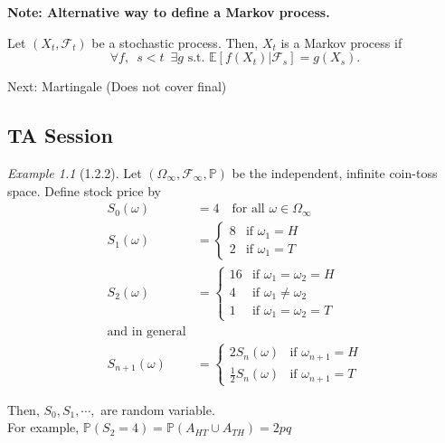 \documentclass[12pt]{report}
\newcommand{\F}{\mathcal{F}}
\newcommand{\E}{\mathbb{E}}
\renewcommand{\1}{\mathbb{1}}
\theoremstyle{break}
\theoremstyle{newdef}
\theoremstyle{remark}
\newtheorem*{exmp}{Example} %
\begin{document}
\vspace{5mm}

\textbf{Note: Alternative way to define a Markov process.}

Let $(X_t, \F_t)$ be a stochastic process.
Then, $X_t$ is a Markov process if
\[\forall f, \enspace s < t \enspace \exists g \text{ s.t. } \E[f(X_t) | \F_s] = g(X_s).\]

Next: Martingale (Does not cover final)





\begin{appendices}
\chapter{TA Session}
\begin{exmp}[1.2.2]
Let $(\Omega_\infty, \mathcal{F}_\infty, \mathbb{P})$ be the independent, infinite coin-toss space.
Define stock price by
$$
\begin{aligned}
S_0(\omega) &= 4 \quad \text{for all } \omega \in \Omega_\infty\\
S_1(\omega) &=
\begin{cases}
8 & \text{if } \omega_1 = H\\
2 & \text{if } \omega_1 = T
\end{cases}
\\
S_2(\omega) &=
\begin{cases}
16 & \text{if } \omega_1 = \omega_2 = H\\
4 & \text{if } \omega_1 \neq \omega_2\\
1 & \text{if } \omega_1 = \omega_2 = T
\end{cases}
\\
\text{and in general}
\\
S_{n+1}(\omega) &=
\begin{cases}
2S_n(\omega) & \text{if } \omega_{n+1} = H\\
\frac{1}{2}S_n(\omega) & \text{if } \omega_{n+1} = T
\end{cases}
\end{aligned}
$$

Then, $S_0, S_1, \cdots, $ are random variable.\\
For example, $\mathbb{P}(S_2 = 4) = \mathbb{P}(A_{HT} \cup A_{TH}) = 2pq$

\end{exmp}




\end{appendices}
\end{document}
